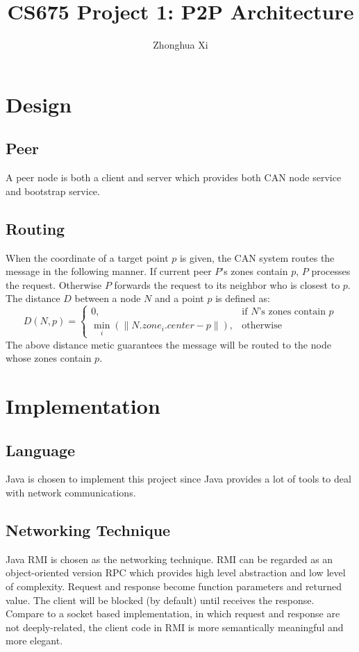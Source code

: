 \documentclass[11pt, oneside]{article}   	%
\title{CS675 Project 1: P2P Architecture}
\author{Zhonghua Xi}
\begin{document}
\maketitle

\section{Design}
\subsection{Peer}
A peer node is both a client and server which provides both CAN node service and bootstrap service.

\subsection{Routing}
When the coordinate of a target point $p$ is given, the CAN system routes the message in the following manner.
If current peer $P$'s zones contain $p$, $P$ processes the request. Otherwise $P$ forwards the request to its neighbor who is closest to $p$. The distance $D$ between a node $N$ and a point $p$ is defined as: 
\begin{equation}
D(N,p) = 
\begin{cases}
    0, 										& \text{if } N \text{'s zones contain } p \\
 	\min\limits_{i}(\lVert N.zone_i.center - p \rVert),      & \text{otherwise}
\end{cases}
\end{equation}
The above distance metic guarantees the message will be routed to the node whose zones contain $p$.


\section{Implementation}

\subsection{Language}
Java is chosen to implement this project since Java provides a lot of tools to deal with network communications.

\subsection{Networking Technique}
Java RMI is chosen as the networking technique. RMI can be regarded as an object-oriented version RPC which provides high level abstraction and low level of complexity.
Request and response become function parameters and returned value. 
The client will be blocked (by default) until receives the response. 
Compare to a socket based implementation, in which request and response are not deeply-related, the client code in RMI is more semantically meaningful and more elegant.
\end{document}
